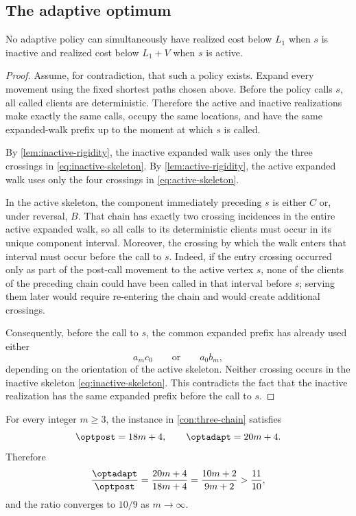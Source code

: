 \subsection{The adaptive optimum}

\begin{lemma}\label{lem:prefix-incompatibility}
No adaptive policy can simultaneously have realized cost below $L_1$ when
$s$ is inactive and realized cost below $L_1+V$ when $s$ is active.
\end{lemma}

\begin{proof}
Assume, for contradiction, that such a policy exists.  Expand every movement
using the fixed shortest paths chosen above.  Before the policy calls $s$, all
called clients are deterministic.  Therefore the active and inactive
realizations make exactly the same calls, occupy the same locations, and have
the same expanded-walk prefix up to the moment at which $s$ is called.

By \cref{lem:inactive-rigidity}, the inactive expanded walk uses only the
three crossings in \cref{eq:inactive-skeleton}.  By
\cref{lem:active-rigidity}, the active expanded walk uses only the four
crossings in \cref{eq:active-skeleton}.

In the active skeleton, the component immediately preceding $s$ is either
$C$ or, under reversal, $B$.  That chain has exactly two crossing incidences in
the entire active expanded walk, so all calls to its deterministic clients must
occur in its unique component interval.  Moreover, the crossing by which the
walk enters that interval must occur before the call to $s$.  Indeed, if the
entry crossing occurred only as part of the post-call movement to the active
vertex $s$, none of the clients of the preceding chain could have been called
in that interval before $s$; serving them later would require re-entering the
chain and would create additional crossings.

Consequently, before the call to $s$, the common expanded prefix has already
used either
\[
  a_mc_0
  \qquad\text{or}\qquad
  a_0b_m,
\]
depending on the orientation of the active skeleton.  Neither crossing occurs
in the inactive skeleton \cref{eq:inactive-skeleton}.  This contradicts the
fact that the inactive realization has the same expanded prefix before the
call to $s$.
\end{proof}

\begin{theorem}\label{thm:three-chain-cost}
For every integer $m\ge3$, the instance in
\cref{con:three-chain} satisfies
\[
  \optpost=18m+4,
  \qquad
  \optadapt=20m+4.
\]
Therefore
\[
  \frac{\optadapt}{\optpost}
  =\frac{20m+4}{18m+4}
  =\frac{10m+2}{9m+2}
  >\frac{11}{10},
\]
and the ratio converges to $10/9$ as $m\to\infty$.
\end{theorem}

